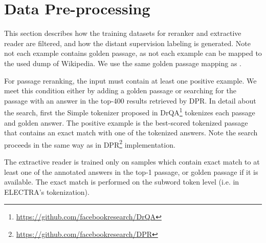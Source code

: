 \documentclass[11pt,a4paper]{article}
\begin{document}
\begin{table}[H]
\vspace{-0.5cm}
    \centering
    \caption{Binary decision -- TQ-Open (test).}
    \label{tab:binary-decision_tqtest}
\end{table}

\section{Data Pre-processing}
\label{app:data_preprocessing}
This section describes how the training datasets for reranker and extractive reader are filtered, and how the distant supervision labeling is generated. Note not each example contains golden passage, as not each example can be mapped to the used dump of Wikipedia. We use the same golden passage mapping as \citet{karpukhin2020dense}.


For passage reranking, the input must contain at least one positive example. We meet this condition either by adding a golden passage or searching for the passage with an answer in the top-400 results retrieved by DPR. In detail about the search, first the Simple tokenizer proposed in DrQA\footnote{\url{https://github.com/facebookresearch/DrQA}} tokenizes each passage and golden answer. The positive example is the best-scored tokenized passage that contains an exact match with one of the tokenized answers. Note the search proceeds in the same way as in DPR\footnote{\url{https://github.com/facebookresearch/DPR}} implementation.























The extractive reader is trained only on samples which contain exact match to at least one of the annotated answers in the top-1 passage, or golden passage if it is available. The exact match is performed on the subword token level (i.e. in ELECTRA's tokenization).
\end{document}
